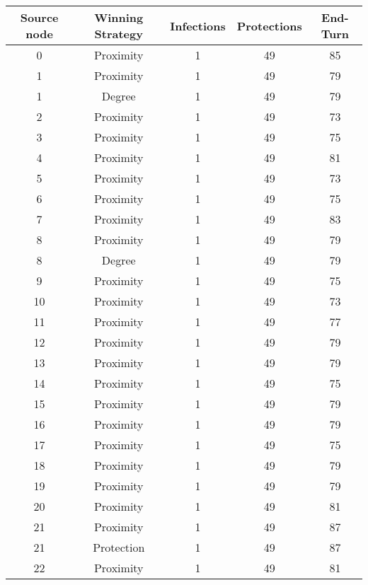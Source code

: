 \documentclass[results.tex]{subfiles}
\begin{document}
\begin{center}
  \begin{tabular}{| c || c | c | c | c |}
    \hline
    {\bfseries Source node} & {\bfseries Winning Strategy} & {\bfseries Infections} & {\bfseries Protections} & {\bfseries End-Turn} \\  %
    \hline\hline
    0 & Proximity & 1 & 49 & 85 \\ 
    \hline
    1 & Proximity & 1 & 49 & 79 \\ 
    \hline
    1 & Degree & 1 & 49 & 79 \\ 
    \hline
    2 & Proximity & 1 & 49 & 73 \\ 
    \hline
    3 & Proximity & 1 & 49 & 75 \\ 
    \hline
    4 & Proximity & 1 & 49 & 81 \\ 
    \hline
    5 & Proximity & 1 & 49 & 73 \\ 
    \hline
    6 & Proximity & 1 & 49 & 75 \\ 
    \hline
    7 & Proximity & 1 & 49 & 83 \\ 
    \hline
    8 & Proximity & 1 & 49 & 79 \\ 
    \hline
    8 & Degree & 1 & 49 & 79 \\ 
    \hline
    9 & Proximity & 1 & 49 & 75 \\ 
    \hline
    10 & Proximity & 1 & 49 & 73 \\ 
    \hline
    11 & Proximity & 1 & 49 & 77 \\ 
    \hline
    12 & Proximity & 1 & 49 & 79 \\ 
    \hline
    13 & Proximity & 1 & 49 & 79 \\ 
    \hline
    14 & Proximity & 1 & 49 & 75 \\ 
    \hline
    15 & Proximity & 1 & 49 & 79 \\ 
    \hline
    16 & Proximity & 1 & 49 & 79 \\ 
    \hline
    17 & Proximity & 1 & 49 & 75 \\ 
    \hline
    18 & Proximity & 1 & 49 & 79 \\ 
    \hline
    19 & Proximity & 1 & 49 & 79 \\ 
    \hline
    20 & Proximity & 1 & 49 & 81 \\ 
    \hline
    21 & Proximity & 1 & 49 & 87 \\ 
    \hline
    21 & Protection & 1 & 49 & 87 \\ 
    \hline
    22 & Proximity & 1 & 49 & 81 \\ 

\end{tabular}
\end{center}
\end{document}
